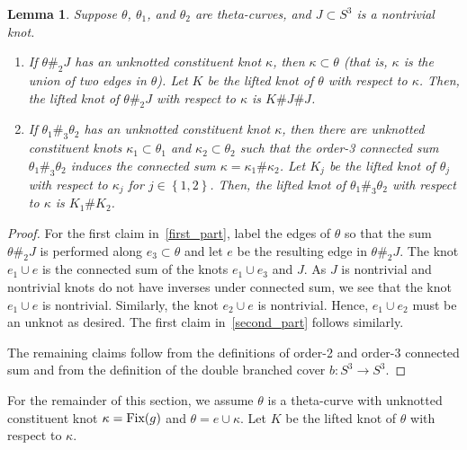 \documentclass{amsart}
\numberwithin{equation}{section}
\newtheorem{lemma}[theorem]{Lemma}
\theoremstyle{definition}
\newcommand{\cpa}[1]{\left\{#1\right\}}
\newcommand{\tn}[1]{\textnormal{#1}}
\begin{document}
\begin{lemma}\label{lem:sum}
Suppose $\theta$, $\theta_1$, and $\theta_2$ are theta-curves, and $J\subset S^3$ is a nontrivial knot.
\begin{enumerate}
\item \label{first_part}If $\theta\#_2J$ has an unknotted constituent knot $\kappa$, then $\kappa\subset\theta$ (that is, $\kappa$ is the union of two edges in $\theta$).
Let $K$ be the lifted knot of $\theta$ with respect to $\kappa$.
Then, the lifted knot of $\theta\#_2J$ with respect to $\kappa$ is $K\#J\#J$.
\item \label{second_part}If $\theta_1\#_3\theta_2$ has an unknotted constituent knot $\kappa$,
then there are unknotted constituent knots $\kappa_1\subset\theta_1$ and $\kappa_2\subset\theta_2$ such that the order-3 connected sum $\theta_1\#_3\theta_2$ induces the connected sum $\kappa=\kappa_1\#\kappa_2$.
Let $K_j$ be the lifted knot of $\theta_j$ with respect to $\kappa_j$ for $j\in\cpa{1,2}$.
Then, the lifted knot of $\theta_1\#_3\theta_2$ with respect to $\kappa$ is $K_1\#K_2$.
\end{enumerate}
\end{lemma}
\begin{proof}
For the first claim in~\ref{first_part}, label the edges of $\theta$ so that the sum $\theta\#_2J$ is performed along $e_3\subset\theta$ and let $e$ be the resulting edge in $\theta\#_2J$. The knot $e_1\cup e$ is the connected sum of the knots $e_1\cup e_3$ and $J$. As $J$ is nontrivial and nontrivial knots do not have inverses under connected sum, we see that the knot $e_1\cup e$ is nontrivial. Similarly, the knot $e_2\cup e$ is nontrivial. Hence, $e_1\cup e_2$ must be an unknot as desired. The first claim in~\ref{second_part} follows similarly.

The remaining claims follow from the definitions of order-2 and order-3 connected sum and from the definition of the double branched cover $b:S^3\to S^3$.
\end{proof}

For the remainder of this section, we assume $\theta$ is a theta-curve with unknotted constituent knot $\kappa=\tn{Fix}(g)$ and $\theta=e\cup\kappa$. 
Let $K$ be the lifted knot of $\theta$ with respect to $\kappa$.
\end{document}
